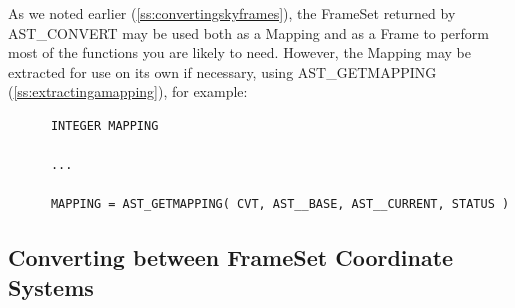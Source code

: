 \documentclass[twoside,11pt]{article}
\newcommand{\htmlref}[2]{#1}
\newcommand{\secref}[1]{\S\ref{#1}}
\renewcommand{\secref}[1]{\ref{#1}}
\begin{document}
As we noted earlier (\secref{ss:convertingskyframes}), the FrameSet
returned by AST\_CONVERT may be used both as a Mapping and as a Frame
to perform most of the functions you are likely to need. However, the
Mapping may be extracted for use on its own if necessary, using
\htmlref{AST\_GETMAPPING}{AST_GETMAPPING} (\secref{ss:extractingamapping}), for example:

\small
\begin{verbatim}
      INTEGER MAPPING

      ...

      MAPPING = AST_GETMAPPING( CVT, AST__BASE, AST__CURRENT, STATUS )
\end{verbatim}
\normalsize

\subsection{\label{ss:framesetconverting}Converting between FrameSet Coordinate Systems}
\end{document}
